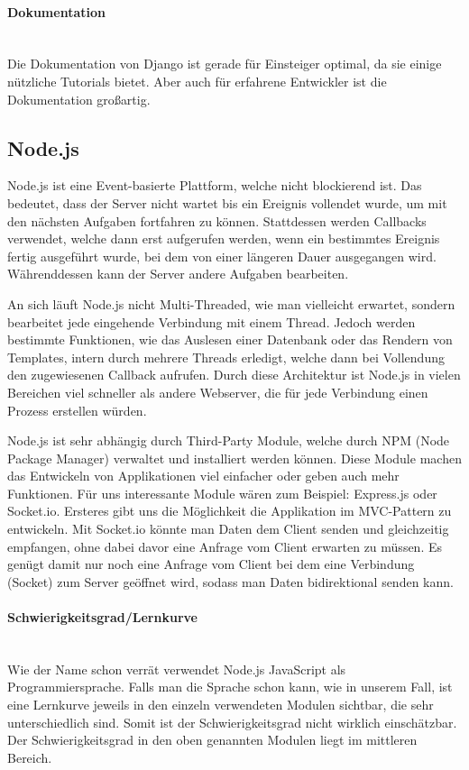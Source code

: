 \documentclass[11pt]{article}
\begin{document}
\paragraph{Dokumentation} \mbox{}\\
Die Dokumentation von Django ist gerade f\"ur Einsteiger optimal, da sie einige n\"utzliche Tutorials bietet. Aber auch f\"ur erfahrene Entwickler ist die Dokumentation gro{\ss}artig.
\newpage

\subsection{Node.js}
Node.js ist eine Event-basierte Plattform, welche nicht blockierend ist. Das bedeutet, dass der Server nicht wartet bis ein Ereignis vollendet wurde, um mit den nächsten Aufgaben fortfahren zu können. Stattdessen werden Callbacks verwendet, welche dann erst aufgerufen werden, wenn ein bestimmtes Ereignis fertig ausgeführt wurde, bei dem von einer längeren Dauer ausgegangen wird. Währenddessen kann der Server andere Aufgaben bearbeiten.

An sich läuft Node.js nicht Multi-Threaded, wie man vielleicht erwartet, sondern bearbeitet jede eingehende Verbindung mit einem Thread. Jedoch werden bestimmte Funktionen, wie das Auslesen einer Datenbank oder das Rendern von Templates, intern durch mehrere Threads erledigt, welche dann bei Vollendung den zugewiesenen Callback aufrufen. Durch diese Architektur ist Node.js in vielen Bereichen viel schneller als andere Webserver, die für jede Verbindung einen Prozess erstellen würden.

Node.js ist sehr abhängig durch Third-Party Module, welche durch NPM (Node Package Manager) verwaltet und installiert werden können. Diese Module machen das Entwickeln von Applikationen viel einfacher oder geben auch mehr Funktionen. Für uns interessante Module wären zum Beispiel: Express.js oder Socket.io. Ersteres gibt uns die Möglichkeit die Applikation im MVC-Pattern zu entwickeln.
Mit Socket.io könnte man Daten dem Client senden und gleichzeitig empfangen, ohne dabei davor eine Anfrage vom Client erwarten zu müssen. Es genügt damit nur noch eine Anfrage vom Client bei dem eine Verbindung (Socket) zum Server geöffnet wird, sodass man Daten bidirektional senden kann.

\paragraph{Schwierigkeitsgrad/Lernkurve} \mbox{}\\
Wie der Name schon verrät verwendet Node.js JavaScript als Programmiersprache. Falls man die Sprache schon kann, wie in unserem Fall, ist eine Lernkurve jeweils in den einzeln verwendeten Modulen sichtbar, die sehr unterschiedlich sind. Somit ist der Schwierigkeitsgrad nicht wirklich einschätzbar. Der Schwierigkeitsgrad in den oben genannten Modulen liegt im mittleren Bereich.
\end{document}
